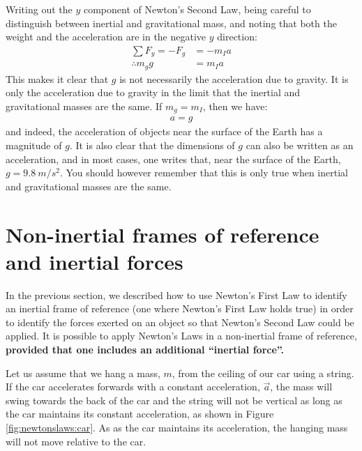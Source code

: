 Writing out the $y$ component of Newton's Second Law, being careful to distinguish between inertial and gravitational mass, and noting that both the weight and the acceleration are in the negative $y$ direction:
\begin{align*}
\sum F_y = -F_g &= -m_I a\\
\therefore m_gg &= m_I a
\end{align*}
This makes it clear that $g$ is not necessarily the acceleration due to gravity. It is only the acceleration due to gravity in the limit that the inertial and gravitational masses are the same. If $m_g=m_I$, then we have:
\begin{align*}
a = g
\end{align*}
and indeed, the acceleration of objects near the surface of the Earth has a magnitude of $g$. It is also clear that the dimensions of $g$ can also be written as an acceleration, and in most cases, one writes that, near the surface of the Earth, $g=\SI{9.8}{m/s^2}$. You should however remember that this is only true when inertial and gravitational masses are the same. 

\section{Non-inertial frames of reference and inertial forces}
\label{sec:newtonslaws:inertialforces}
In the previous section, we described how to use Newton's First Law to identify an inertial frame of reference (one where Newton's First Law holds true) in order to identify the forces exerted on an object so that Newton's Second Law could be applied. It is possible to apply Newton's Laws in a non-inertial frame of reference, \textbf{provided that one includes an additional ``inertial force''.}

Let us assume that we hang a mass, $m$, from the ceiling of our car using a string. If the car accelerates forwards with a constant acceleration, $\vec a$, the mass will swing towards the back of the car and the string will not be vertical as long as the car maintains its constant acceleration, as shown in Figure \ref{fig:newtonslaws:car}. As as the car maintains its acceleration, the hanging mass will not move relative to the car.


